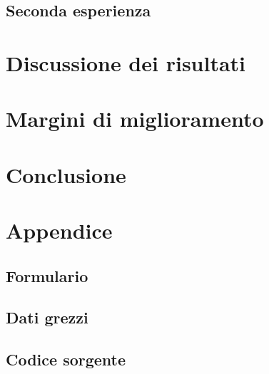 \documentclass[a4paper,11pt,oneside]{article}
\begin{document}
\subsection{Seconda esperienza}



\section{Discussione dei risultati}
\section{Margini di miglioramento}
\section{Conclusione}
\newpage
\section{Appendice}
\subsection{Formulario}
\subsection{Dati grezzi}
\subsection{Codice sorgente}
\end{document}
